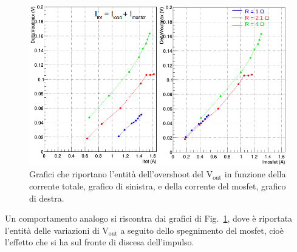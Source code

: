 %
%

\begin{figure}
\centering
\includegraphics[width=0.9\linewidth]{Immagini/VoutOver}
\caption{Grafici che riportano l'entità dell'overshoot del $\mathrm{V_{out}}$ in funzione della corrente totale, grafico di sinistra, e della corrente del mosfet, grafico di destra.}
\label{VoutOver}
\end{figure}

Un comportamento analogo si riscontra dai grafici di Fig.~\ref{VoutOver}, dove è riportata l'entità delle variazioni di $\mathrm{V_{out}}$ a seguito dello spegnimento del mosfet, cioè l'effetto che si ha sul fronte di discesa dell'impulso. 

